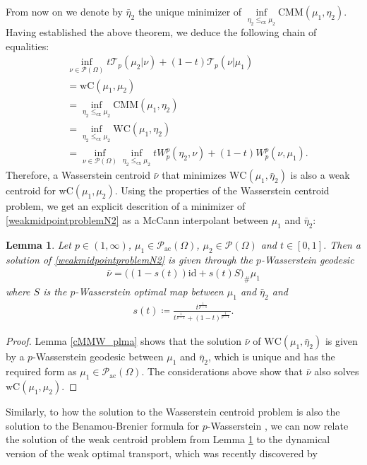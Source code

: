 \documentclass[10pt,a4paper]{amsart}
\newtheorem{lma}[thm]{Lemma}
\begin{document}
From now on we denote by $\bar\eta_2$ the unique minimizer of $\inf\limits_{\eta_2\leq_{\text{cx}}\mu_2}\text{CMM}(\mu_1,\eta_2)$.
Having established the above theorem, we deduce the following chain of equalities:
\begin{align*}
	&\inf_{\nu\in\mathcal P(\Omega)}t\mathcal T_p(\mu_2|\nu)+(1-t)\mathcal T_p(\nu|\mu_1)\\
	&=\text{wC}(\mu_1,\mu_2)\\
	&=\inf_{\eta_2\leq_{\text{cx}}\mu_2}\text{CMM}(\mu_1,\eta_2)\\
	&=\inf_{\eta_2\leq_{\text{cx}}\mu_2}\text{WC}(\mu_1,\eta_2)\\
	&=\inf_{\nu\in\mathcal P(\Omega)}\inf_{\eta_2\leq_{\text{cx}}\mu_2}tW_p^p(\eta_2,\nu)+(1-t)W_p^p(\nu,\mu_1).
\end{align*}
Therefore, a Wasserstein centroid $\bar\nu$ that minimizes $\text{WC}(\mu_1,\bar\eta_2)$ is also a weak centroid for $\text{wC}(\mu_1,\mu_2)$.
Using the properties of the Wasserstein centroid problem, we get an explicit descrition of a minimizer of \eqref{weakmidpointproblemN2} as a McCann interpolant \cite{mccann1997} between $\mu_1$ and $\bar\eta_2$:
\begin{lma}\label{dynamicalweakbarthm}
	Let $p\in(1,\infty)$, $\mu_1\in\mathcal P_{\text{ac}}(\Omega)$, $\mu_2\in\mathcal P(\Omega)$ and $t\in[0,1]$. Then a solution of \eqref{weakmidpointproblemN2} is given through the $p$-Wasserstein geodesic
	\begin{gather*}
		\bar\nu=\big((1-s(t))\text{id}+s(t)S\big)_{\#}\mu_1
	\end{gather*}
	where $S$ is the $p$-Wasserstein optimal map between $\mu_1$ and $\bar\eta_2$ and
	\begin{gather*}
		s(t)\coloneqq\frac{t^{\frac{1}{p-1}}}{t^{\frac{1}{p-1}}+(1-t)^{\frac{1}{p-1}}}.
	\end{gather*}
\end{lma}
\begin{proof}
		Lemma \ref{cMMW_plma} shows that the solution $\bar\nu$ of $\text{WC}(\mu_1,\bar\eta_2)$ is given by a $p$-Wasserstein geodesic between $\mu_1$ and $\bar\eta_2$, which is unique and has the required form \cite[Thm 5.27]{santambrogio2015} as $\mu_1\in\mathcal P_{\text{ac}}(\Omega)$. The considerations above show that $\bar\nu$ also solves $\text{wC}(\mu_1,\mu_2)$.
\end{proof}
Similarly, to how the solution to the Wasserstein centroid problem is also the solution to the Benamou-Brenier formula for $p$-Wasserstein \cite[6.2]{agueh2011}, we can now relate the solution of the weak centroid problem from Lemma \ref{dynamicalweakbarthm} to the dynamical version of the weak optimal transport, which was recently discovered by
\end{document}
